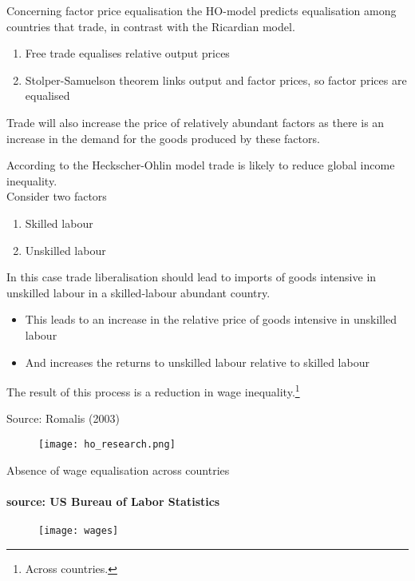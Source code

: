 \documentclass{beamer}
\begin{document}
\begin{frame}
  Concerning factor price equalisation the HO-model predicts equalisation among countries that trade, in contrast with the Ricardian model. 
  \begin{enumerate}
    \item Free trade equalises relative output prices
    \item Stolper-Samuelson theorem links output and factor prices, so factor prices are equalised
  \end{enumerate}
  Trade will also increase the price of relatively abundant factors as there is an increase in the demand for the goods produced by these factors.
\end{frame}

\begin{frame}
  According to the Heckscher-Ohlin model trade is likely to reduce global income inequality.\\
  Consider two factors
  \begin{enumerate}
    \item Skilled labour
    \item Unskilled labour
  \end{enumerate} 
  \medskip
  In this case trade liberalisation should lead to imports of goods intensive in unskilled labour in a skilled-labour abundant country.   
  \begin{itemize}
    \item This leads to an increase in the relative price of goods intensive in unskilled labour
    \item And increases the returns to unskilled labour relative to skilled labour
  \end{itemize}
  \medskip
  The result of this process is a reduction in wage inequality.\footnote{Across countries.} 
\end{frame}

\begin{frame}{Source: Romalis (2003)}
  \begin{figure}
    \texttt{[image: ho\_research.png]}
  \end{figure}
\end{frame}

\begin{frame}{Absence of wage equalisation across countries}
\framesubtitle{source: US Bureau of Labor Statistics}
  \begin{figure}
    \texttt{[image: wages]}
  \end{figure}
\end{frame}
\end{document}
